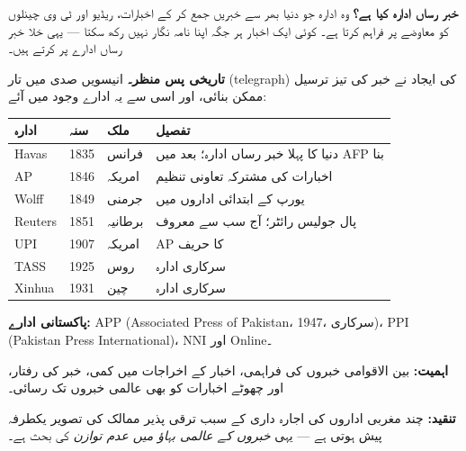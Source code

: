 \begin{hal}
\textbf{خبر رساں ادارہ کیا ہے؟} وہ ادارہ جو دنیا بھر سے خبریں جمع کر کے
اخبارات، ریڈیو اور ٹی وی چینلوں کو معاوضے پر فراہم کرتا ہے۔ کوئی ایک اخبار ہر
جگہ اپنا نامہ نگار نہیں رکھ سکتا --- یہی خلا خبر رساں ادارے پر کرتے ہیں۔

\medskip
\textbf{تاریخی پس منظر۔} انیسویں صدی میں تار (\textenglish{telegraph}) کی
ایجاد نے خبر کی تیز ترسیل ممکن بنائی، اور اسی سے یہ ادارے وجود میں آئے:

\begin{center}
\begin{tabular}{@{}p{3.0cm} p{1.8cm} p{2.4cm} p{6.6cm}@{}}
\toprule
\textbf{ادارہ} & \textbf{سنہ} & \textbf{ملک} & \textbf{تفصیل} \\
\midrule
\textenglish{Havas} & \textenglish{1835} & فرانس & دنیا کا پہلا خبر رساں ادارہ؛ بعد میں \textenglish{AFP} بنا \\
\textenglish{AP} & \textenglish{1846} & امریکہ & اخبارات کی مشترکہ تعاونی تنظیم \\
\textenglish{Wolff} & \textenglish{1849} & جرمنی & یورپ کے ابتدائی اداروں میں \\
\textenglish{Reuters} & \textenglish{1851} & برطانیہ & پال جولیس رائٹر؛ آج سب سے معروف \\
\textenglish{UPI} & \textenglish{1907} & امریکہ & \textenglish{AP} کا حریف \\
\textenglish{TASS} & \textenglish{1925} & روس & سرکاری ادارہ \\
\textenglish{Xinhua} & \textenglish{1931} & چین & سرکاری ادارہ \\
\bottomrule
\end{tabular}
\end{center}

\medskip
\textbf{پاکستانی ادارے:} \textenglish{APP} (\textenglish{Associated Press of
Pakistan}، \textenglish{1947}، سرکاری)، \textenglish{PPI} (\textenglish{Pakistan
Press International})، \textenglish{NNI} اور \textenglish{Online}۔

\medskip
\textbf{اہمیت:} بین الاقوامی خبروں کی فراہمی، اخبار کے اخراجات میں کمی، خبر کی
رفتار، اور چھوٹے اخبارات کو بھی عالمی خبروں تک رسائی۔

\textbf{تنقید:} چند مغربی اداروں کی اجارہ داری کے سبب ترقی پذیر ممالک کی تصویر
یکطرفہ پیش ہوتی ہے --- یہی \emph{خبروں کے عالمی بہاؤ میں عدم توازن} کی بحث ہے۔

\end{hal}

